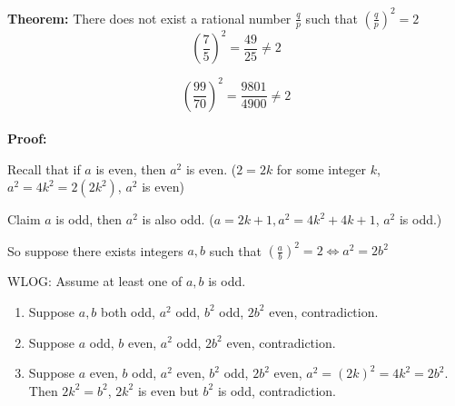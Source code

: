 \documentclass[a4paper, 11pt, twoside]{article}
\begin{document}
\textbf{Theorem:} There does not exist a rational number $\frac{q}{p}$ such that $\left(\frac{q}{p}\right)^2 = 2$
\\

\[ \left(\frac{7}{5}\right)^2 = \frac{49}{25} \not = 2\]

\[ \left(\frac{99}{70}\right)^2 = \frac{9801}{4900} \not = 2\]
\\

\textbf{Proof:}

Recall that if $a$ is even, then $a^2$ is even. ($2=2k$ for some integer $k$, $a^2=4k^2 = 2(2k^2)$, $a^2$ is even)

Claim $a$ is odd, then $a^2$ is also odd. ($a=2k+1, a^2=4k^2+4k+1$, $a^2$ is odd.)

So suppose there exists integers $a, b$ such that $\left(\frac{a}{b}\right)^2 = 2 \iff a^2=2b^2$

WLOG: Assume at least one of $a, b$ is odd.

\begin{enumerate}
	\item Suppose $a, b$ both odd, $a^2$ odd, $b^2$ odd, $2b^2$ even, contradiction.
	\item Suppose $a$ odd, $b$ even, $a^2$ odd, $2b^2$ even, contradiction.
	\item Suppose $a$ even, $b$ odd, $a^2$ even, $b^2$ odd, $2b^2$ even, $a^2=(2k)^2=4k^2=2b^2$. Then $2k^2=b^2$, $2k^2$ is even but $b^2$ is odd, contradiction.
\end{enumerate}
\end{document}
